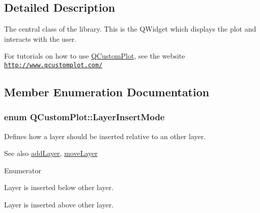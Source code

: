 \subsection{Detailed Description}
The central class of the library. This is the Q\+Widget which displays the plot and interacts with the user. 

For tutorials on how to use \hyperlink{class_q_custom_plot}{Q\+Custom\+Plot}, see the website~\newline
\href{http://www.qcustomplot.com/}{\tt http\+://www.\+qcustomplot.\+com/} 

\subsection{Member Enumeration Documentation}
\subsubsection[{\texorpdfstring{Layer\+Insert\+Mode}{LayerInsertMode}}]{\setlength{\rightskip}{0pt plus 5cm}enum {\bf Q\+Custom\+Plot\+::\+Layer\+Insert\+Mode}}\hypertarget{class_q_custom_plot_a75a8afbe6ef333b1f3d47abb25b9add7}{}\label{class_q_custom_plot_a75a8afbe6ef333b1f3d47abb25b9add7}
Defines how a layer should be inserted relative to an other layer.

\begin{DoxySeeAlso}{See also}
\hyperlink{class_q_custom_plot_ad5255393df078448bb6ac83fa5db5f52}{add\+Layer}, \hyperlink{class_q_custom_plot_ae896140beff19424e9e9e02d6e331104}{move\+Layer} 
\end{DoxySeeAlso}
\begin{Desc}
\item[Enumerator]\par
\begin{description}
\item[{\em 
lim\+Below\hypertarget{class_q_custom_plot_a75a8afbe6ef333b1f3d47abb25b9add7aee39cf650cd24e68552da0b697ce4a93}{}\label{class_q_custom_plot_a75a8afbe6ef333b1f3d47abb25b9add7aee39cf650cd24e68552da0b697ce4a93}
}]Layer is inserted below other layer. \item[{\em 
lim\+Above\hypertarget{class_q_custom_plot_a75a8afbe6ef333b1f3d47abb25b9add7a062b0b7825650b432a713c0df6742d41}{}\label{class_q_custom_plot_a75a8afbe6ef333b1f3d47abb25b9add7a062b0b7825650b432a713c0df6742d41}
}]Layer is inserted above other layer. \end{description}
\end{Desc}
